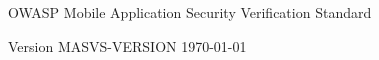 \thispagestyle{empty} %

OWASP Mobile Application Security Verification Standard


Version {{MASVS-VERSION}} \today
